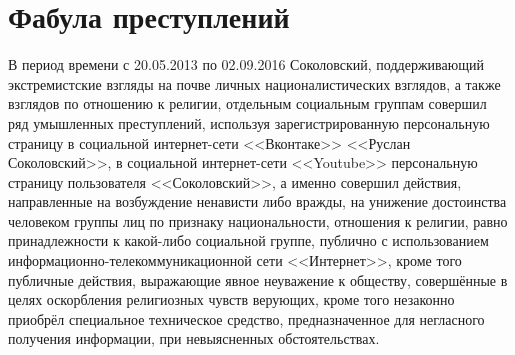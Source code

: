 \documentclass[a4paper]{article}
\begin{document}
	\thispagestyle{empty}
	
	
	
	\newpage
	
	\tableofcontents
	
	\pagestyle{plain}
	
	\newpage
	
	\section{Фабула преступлений}
		В период времени с 20.05.2013 по 02.09.2016 Соколовский, поддерживающий экстремистские взгляды на почве личных националистических взглядов, а также взглядов по отношению к религии, отдельным социальным группам совершил ряд умышленных преступлений, используя зарегистрированную персональную страницу в социальной интернет-сети <<Вконтаке>> <<Руслан Соколовский>>, в социальной интернет-сети <<Youtube>> персональную страницу пользователя <<Соколовский>>, а именно совершил действия, направленные на возбуждение ненависти либо вражды, на унижение достоинства человеком группы лиц по признаку национальности, отношения к религии, равно принадлежности к какой-либо социальной группе, публично с использованием информационно-телекоммуникационной сети <<Интернет>>, кроме того публичные действия, выражающие явное неуважение к обществу, совершённые в целях оскорбления религиозных чувств верующих, кроме того незаконно приобрёл специальное техническое средство, предназначенное для негласного получения информации, при невыясненных обстоятельствах.
\end{document}
